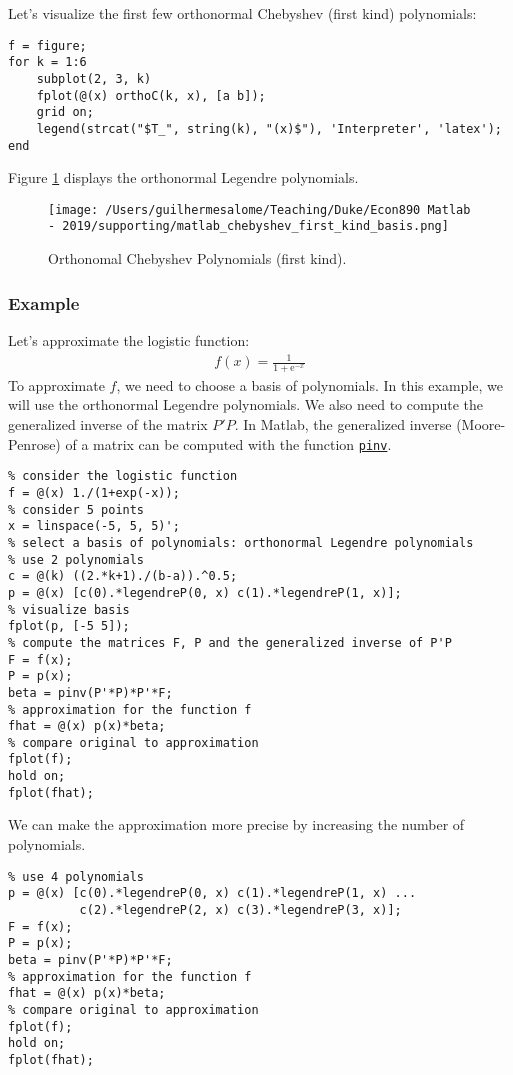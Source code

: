 \documentclass[12pt, a4paper]{article}
\newcommand{\e}[1]{\text{e}^{#1}}
\begin{document}
Let's visualize the first few orthonormal Chebyshev (first kind) polynomials:
\lstset{language=matlab,label= ,caption= ,captionpos=b,firstnumber=1,numbers=left,style=Matlab-editor}
\begin{lstlisting}
f = figure;
for k = 1:6
    subplot(2, 3, k)
    fplot(@(x) orthoC(k, x), [a b]);
    grid on;
    legend(strcat("$T_", string(k), "(x)$"), 'Interpreter', 'latex');
end
\end{lstlisting}
Figure \ref{fig:orgb14ac18} displays the orthonormal Legendre polynomials.
\begin{figure}[H]
\centering
\texttt{[image: /Users/guilhermesalome/Teaching/Duke/Econ890 Matlab - 2019/supporting/matlab\_chebyshev\_first\_kind\_basis.png]}
\caption{\label{fig:orgb14ac18}
Orthonomal Chebyshev Polynomials (first kind).}
\end{figure}
\subsubsection{Example}
\label{sec:org1064d54}
Let's approximate the logistic function:
\begin{align*}
f(x)=\frac{1}{1+\e{-x}}
\end{align*}
To approximate \(f\), we need to choose a basis of polynomials.
In this example, we will use the orthonormal Legendre polynomials.
We also need to compute the generalized inverse of the matrix \(P'P\).
In Matlab, the generalized inverse (Moore-Penrose) of a matrix can be computed with the function \href{https://www.mathworks.com/help/matlab/ref/pinv.html?s\_tid=doc\_ta}{\texttt{pinv}}.
\lstset{language=matlab,label= ,caption= ,captionpos=b,firstnumber=1,numbers=left,style=Matlab-editor}
\begin{lstlisting}
% consider the logistic function
f = @(x) 1./(1+exp(-x));
% consider 5 points
x = linspace(-5, 5, 5)';
% select a basis of polynomials: orthonormal Legendre polynomials
% use 2 polynomials
c = @(k) ((2.*k+1)./(b-a)).^0.5;
p = @(x) [c(0).*legendreP(0, x) c(1).*legendreP(1, x)];
% visualize basis
fplot(p, [-5 5]);
% compute the matrices F, P and the generalized inverse of P'P
F = f(x);
P = p(x);
beta = pinv(P'*P)*P'*F;
% approximation for the function f
fhat = @(x) p(x)*beta;
% compare original to approximation
fplot(f);
hold on;
fplot(fhat);
\end{lstlisting}

We can make the approximation more precise by increasing the number of polynomials.
\lstset{language=matlab,label= ,caption= ,captionpos=b,firstnumber=1,numbers=left,style=Matlab-editor}
\begin{lstlisting}
% use 4 polynomials
p = @(x) [c(0).*legendreP(0, x) c(1).*legendreP(1, x) ...
          c(2).*legendreP(2, x) c(3).*legendreP(3, x)];
F = f(x);
P = p(x);
beta = pinv(P'*P)*P'*F;
% approximation for the function f
fhat = @(x) p(x)*beta;
% compare original to approximation
fplot(f);
hold on;
fplot(fhat);
\end{lstlisting}
\end{document}
